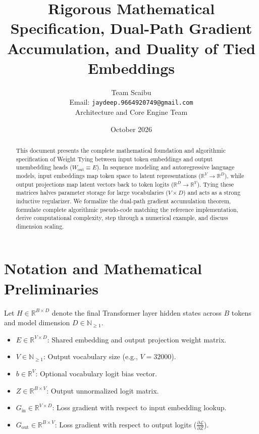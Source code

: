 \documentclass[11pt,a4paper]{article}
\title{\textbf{Rigorous Mathematical Specification, Dual-Path Gradient Accumulation, and Duality of Tied Embeddings}}
\author{Team Scaibu \\ \small Email: \texttt{jaydeep.9664920749@gmail.com} \\ \small Architecture and Core Engine Team}
\date{October 2026}
\theoremstyle{definition}
\begin{document}
\maketitle

\begin{abstract}
This document presents the complete mathematical foundation and algorithmic specification of Weight Tying between input token embeddings and output unembedding heads ($W_{\text{out}} \equiv E$). In sequence modeling and autoregressive language models, input embeddings map token space to latent representations ($\mathbb{R}^V \to \mathbb{R}^D$), while output projections map latent vectors back to token logits ($\mathbb{R}^D \to \mathbb{R}^V$). Tying these matrices halves parameter storage for large vocabularies ($V \times D$) and acts as a strong inductive regularizer. We formalize the dual-path gradient accumulation theorem, formulate complete algorithmic pseudo-code matching the reference implementation, derive computational complexity, step through a numerical example, and discuss dimension scaling.
\end{abstract}

\section{Notation and Mathematical Preliminaries}

Let $H \in \mathbb{R}^{B \times D}$ denote the final Transformer layer hidden states across $B$ tokens and model dimension $D \in \mathbb{N}_{\ge 1}$.

\begin{itemize}
    \item $E \in \mathbb{R}^{V \times D}$: Shared embedding and output projection weight matrix.
    \item $V \in \mathbb{N}_{\ge 1}$: Output vocabulary size (e.g., $V = 32000$).
    \item $b \in \mathbb{R}^V$: Optional vocabulary logit bias vector.
    \item $Z \in \mathbb{R}^{B \times V}$: Output unnormalized logit matrix.
    \item $G_{\text{in}} \in \mathbb{R}^{V \times D}$: Loss gradient with respect to input embedding lookup.
    \item $G_{\text{out}} \in \mathbb{R}^{B \times V}$: Loss gradient with respect to output logits ($\frac{\partial \mathcal{L}}{\partial Z}$).
\end{itemize}
\end{document}
